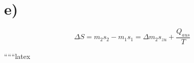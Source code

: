 

\section*{e)}
\[
\Delta S = m_2 s_2 - m_1 s_1 = \Delta m_2 s_{zu} + \frac{Q_{aus}}{T}
\]

``````latex